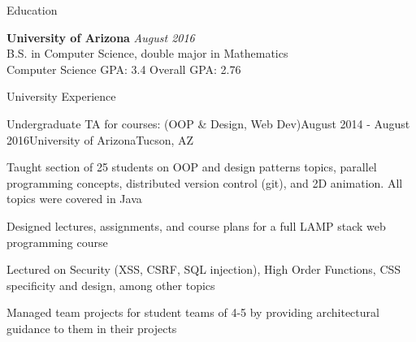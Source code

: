 \documentclass{resume} %
\begin{document}
\begin{rSection}{Education}
	
	{\bf University of Arizona} \hfill {\em August 2016} \\ 
	B.S. in Computer Science, double major in Mathematics  \smallskip \\
	Computer Science GPA: 3.4 \smallskip Overall GPA: 2.76
	
\end{rSection}

\begin{rSection}{University Experience}
	
	\begin{rSubsection}{Undergraduate TA for courses: (OOP \& Design, Web Dev)}{August 2014 - August 2016}{University of Arizona}{Tucson, AZ}
		\item Taught section of 25 students on OOP and design patterns topics, parallel programming concepts, distributed version control (git), and 2D animation. All topics were covered in Java
		\item Designed lectures, assignments, and course plans for a full LAMP stack web programming course
		\item Lectured on Security (XSS, CSRF, SQL injection), High Order Functions, CSS specificity and design, among other topics
		\item Managed team projects for student teams of 4-5 by providing architectural guidance to them in their projects
	\end{rSubsection}

\end{rSection}

\end{document}
